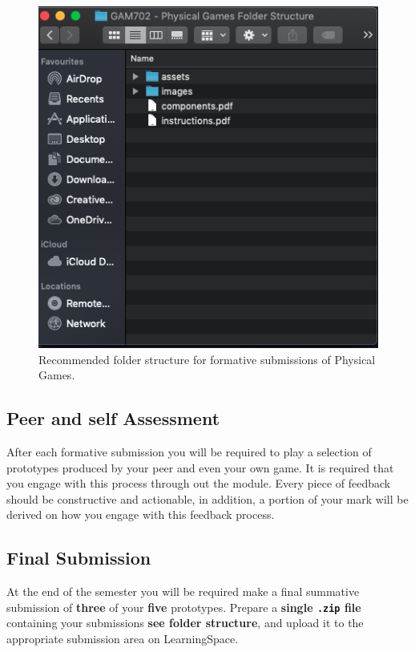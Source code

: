 \documentclass{../../fal_assignment}
\begin{document}
\begin{figure}[H]
	\begin{center}
		\includegraphics[height=0.4\textheight]{physical_games_folder_structure}
	\end{center}
	\caption{Recommended folder structure for formative submissions of Physical Games.}
	\label{fig:phyical_game_folder_structure}
\end{figure}

\pagebreak
\subsection*{Peer and self Assessment}
After each formative submission you will be required to play a selection of prototypes produced by your peer and even your own game. It is required that you engage with
this process through out the module. Every piece of feedback should be constructive and actionable, in addition, a portion of your mark will be derived on how you engage with this
feedback process. 

\pagebreak
\subsection*{Final Submission}

At the end of the semester you will be required make a final summative submission of \textbf{three} of your \textbf{five} prototypes. 
Prepare a \textbf{single \texttt{.zip} file} containing your submissions \textbf{see folder structure}, and upload it to the appropriate submission area on LearningSpace.
\end{document}
